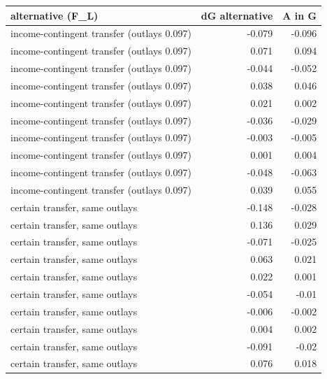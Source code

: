 \begin{tabular}{lrr}
\toprule
alternative (F\_L) & dG alternative & A in G \\
\midrule
income-contingent transfer (outlays 0.097) & -0.079 & -0.096 \\
income-contingent transfer (outlays 0.097) & 0.071 & 0.094 \\
income-contingent transfer (outlays 0.097) & -0.044 & -0.052 \\
income-contingent transfer (outlays 0.097) & 0.038 & 0.046 \\
income-contingent transfer (outlays 0.097) & 0.021 & 0.002 \\
income-contingent transfer (outlays 0.097) & -0.036 & -0.029 \\
income-contingent transfer (outlays 0.097) & -0.003 & -0.005 \\
income-contingent transfer (outlays 0.097) & 0.001 & 0.004 \\
income-contingent transfer (outlays 0.097) & -0.048 & -0.063 \\
income-contingent transfer (outlays 0.097) & 0.039 & 0.055 \\
certain transfer, same outlays & -0.148 & -0.028 \\
certain transfer, same outlays & 0.136 & 0.029 \\
certain transfer, same outlays & -0.071 & -0.025 \\
certain transfer, same outlays & 0.063 & 0.021 \\
certain transfer, same outlays & 0.022 & 0.001 \\
certain transfer, same outlays & -0.054 & -0.01 \\
certain transfer, same outlays & -0.006 & -0.002 \\
certain transfer, same outlays & 0.004 & 0.002 \\
certain transfer, same outlays & -0.091 & -0.02 \\
certain transfer, same outlays & 0.076 & 0.018 \\
\bottomrule
\end{tabular}
